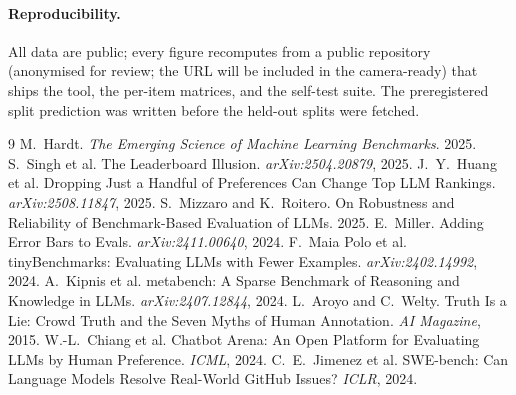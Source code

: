 \documentclass{article}
\begin{document}
\paragraph{Reproducibility.} All data are public; every figure recomputes from a public repository
(anonymised for review; the URL will be included in the camera-ready) that ships the tool, the per-item
matrices, and the self-test suite. The preregistered split prediction was written before the held-out
splits were fetched.

\begin{thebibliography}{9}\small
{} M.~Hardt. \emph{The Emerging Science of Machine Learning Benchmarks}. 2025.
 S.~Singh et al. The Leaderboard Illusion. \emph{arXiv:2504.20879}, 2025.
 J.~Y.~Huang et al. Dropping Just a Handful of Preferences Can Change Top LLM Rankings. \emph{arXiv:2508.11847}, 2025.
 S.~Mizzaro and K.~Roitero. On Robustness and Reliability of Benchmark-Based Evaluation of LLMs. 2025.
 E.~Miller. Adding Error Bars to Evals. \emph{arXiv:2411.00640}, 2024.
 F.~Maia Polo et al. tinyBenchmarks: Evaluating LLMs with Fewer Examples. \emph{arXiv:2402.14992}, 2024.
 A.~Kipnis et al. metabench: A Sparse Benchmark of Reasoning and Knowledge in LLMs. \emph{arXiv:2407.12844}, 2024.
 L.~Aroyo and C.~Welty. Truth Is a Lie: Crowd Truth and the Seven Myths of Human Annotation. \emph{AI Magazine}, 2015.
 W.-L.~Chiang et al. Chatbot Arena: An Open Platform for Evaluating LLMs by Human Preference. \emph{ICML}, 2024.
 C.~E.~Jimenez et al. SWE-bench: Can Language Models Resolve Real-World GitHub Issues? \emph{ICLR}, 2024.
\end{thebibliography}
\end{document}
